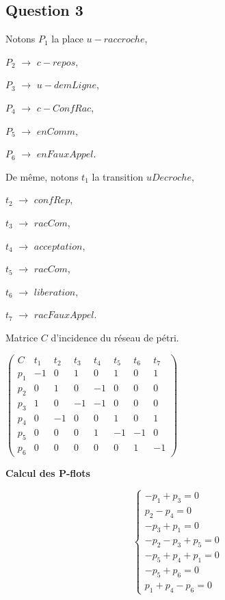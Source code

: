 \subsection*{Question 3}

Notons $P_1$ la place $u-raccroche$, 

$P_2$ $\rightarrow$ $c-repos$, 

$P_3$ $\rightarrow$ $u-demLigne$, 

$P_4$ $\rightarrow$ $c-ConfRac$, 

$P_5$ $\rightarrow$ $enComm$, 

$P_6$ $\rightarrow$ $enFauxAppel$.

De même, notons $t_1$ la transition $uDecroche$, 

$t_2$ $\rightarrow$ $confRep$,

$t_3$ $\rightarrow$ $racCom$, 

$t_4$ $\rightarrow$ $acceptation$, 

$t_5$ $\rightarrow$ $racCom$, 

$t_6$ $\rightarrow$ $liberation$, 

$t_7$ $\rightarrow$ $racFauxAppel$.

Matrice $C$ d'incidence du réseau de pétri.  

 $ \begin{pmatrix}
C&t_1&t_2&t_3&t_4&t_5&t_6&t_7 \\
p_1& -1&0&1&0&1&0&1 \\
p_2&0&1&0&-1&0&0&0 \\
p_3&1&0&-1&-1&0&0&0 \\
p_4&0&-1&0&0&1&0&1 \\
p_5&0&0&0&1&-1&-1&0 \\
p_6&0&0&0&0&0&1&-1
\end{pmatrix}$


\textbf{Calcul des P-flots}


\begin{equation}
\begin{cases}
-p_1 + p_3 = 0 \\

p_2 - p_4 = 0 \\

-p_3 + p_1 = 0 \\

-p_2 - p_3 + p_5 = 0 \\

-p_5 + p_4 + p_1 = 0 \\

-p_5 + p_6 = 0 \\

 p_1 + p_4 - p_6 = 0
\end{cases}
\end{equation}

